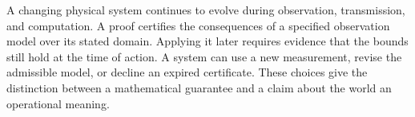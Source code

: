 A changing physical system continues to evolve during observation, transmission, and computation. A proof certifies the consequences of a specified observation model over its stated domain. Applying it later requires evidence that the bounds still hold at the time of action. A system can use a new measurement, revise the admissible model, or decline an expired certificate. These choices give the distinction between a mathematical guarantee and a claim about the world an operational meaning.
